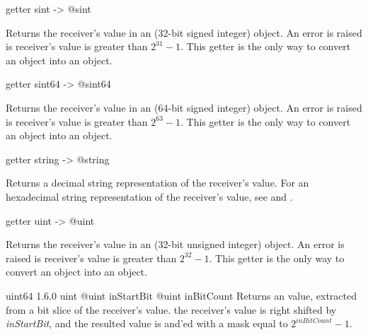 
\begin{galgascode}
getter sint -> @sint
\end{galgascode}

Returns the receiver's value in an  (32-bit signed integer) object. An error is raised is receiver's value is greater than $2^{31}-1$. This getter is the only way to convert an  object into an  object.




\begin{galgascode}
getter sint64 -> @sint64
\end{galgascode}

Returns the receiver's value in an  (64-bit signed integer) object. An error is raised is receiver's value is greater than $2^{63}-1$. This getter is the only way to convert an  object into an  object.



\begin{galgascode}
getter string -> @string
\end{galgascode}

Returns a decimal string representation of the receiver's value. For an hexadecimal string representation of the receiver's value, see  and .




\begin{galgascode}
getter uint -> @uint
\end{galgascode}

Returns the receiver's value in an  (32-bit unsigned integer) object. An error is raised is receiver's value is greater than $2^{32}-1$. This getter is the only way to convert an  object into an  object.


{uint64}
{1.6.0}
{uint}
{@uint inStartBit}
{@uint inBitCount}
{Returns an  value, extracted from a bit slice of the receiver's value.}
{the receiver's value is right shifted by \emph{inStartBit}, and the resulted value is and'ed with a mask equal to $2^{inBitCount}-1$.}


